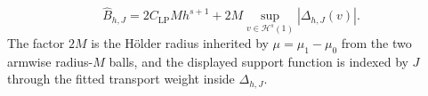 \[\widehat B_{h,J}=2C_{\mathrm{LP}}Mh^{s+1}+2M\sup_{v\in\mathcal H^s(1)}|\Delta_{h,J}(v)|.\] The factor \(2M\) is the Hölder radius inherited by \(\mu=\mu_1-\mu_0\) from the two armwise radius-\(M\) balls, and the displayed support function is indexed by \(J\) through the fitted transport weight inside \(\Delta_{h,J}\).